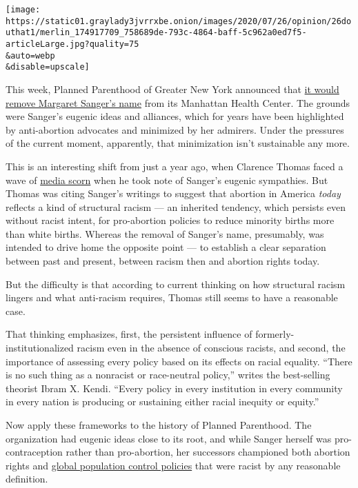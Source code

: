 \texttt{[image: https://static01.graylady3jvrrxbe.onion/images/2020/07/26/opinion/26douthat1/merlin\_174917709\_758689de-793c-4864-baff-5c962a0ed7f5-articleLarge.jpg?quality=75\\\&auto=webp\\\&disable=upscale]}

This week, Planned Parenthood of Greater New York announced that
\href{https://www.cnn.com/2020/07/22/us/margaret-sanger-planned-parenthood-trnd/index.html}{it
would remove Margaret Sanger's name} from its Manhattan Health Center.
The grounds were Sanger's eugenic ideas and alliances, which for years
have been highlighted by anti-abortion advocates and minimized by her
admirers. Under the pressures of the current moment, apparently, that
minimization isn't sustainable any more.

This is an interesting shift from just a year ago, when Clarence Thomas
faced a wave of
\href{https://www.washingtonpost.com/history/2019/05/31/clarence-thomas-tried-link-abortion-eugenics-seven-historians-told-post-hes-wrong/?utm_term=.0c5106b1bcd7}{media
scorn} when he took note of Sanger's eugenic sympathies. But Thomas was
citing Sanger's writings to suggest that abortion in America
\emph{today} reflects a kind of structural racism --- an inherited
tendency, which persists even without racist intent, for pro-abortion
policies to reduce minority births more than white births. Whereas the
removal of Sanger's name, presumably, was intended to drive home the
opposite point --- to establish a clear separation between past and
present, between racism then and abortion rights today.

But the difficulty is that according to current thinking on how
structural racism lingers and what anti-racism requires, Thomas still
seems to have a reasonable case.

That thinking emphasizes, first, the persistent influence of
formerly-institutionalized racism even in the absence of conscious
racists, and second, the importance of assessing every policy based on
its effects on racial equality. ``There is no such thing as a nonracist
or race-neutral policy,'' writes the best-selling theorist Ibram X.
Kendi. ``Every policy in every institution in every community in every
nation is producing or sustaining either racial inequity or equity.''

Now apply these frameworks to the history of Planned Parenthood. The
organization had eugenic ideas close to its root, and while Sanger
herself was pro-contraception rather than pro-abortion, her successors
championed both abortion rights and
\href{https://www.hup.harvard.edu/catalog.php?isbn=9780674034600}{global
population control policies} that were racist by any reasonable
definition.


